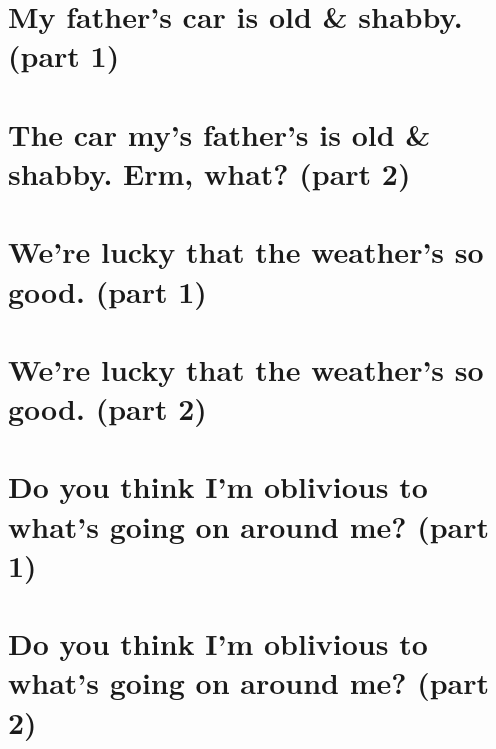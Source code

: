 \documentclass[oneside]{article}
\numberwithin{equation}{section}
\begin{document}
\section{My father's car is old \& shabby. (part 1)}

\section{The car my's father's is old \& shabby. Erm, what? (part 2)}

\section{We're lucky that the weather's so good. (part 1)}

\section{We're lucky that the weather's so good. (part 2)}

\section{Do you think I'm oblivious to what's going on around me? (part 1)}

\section{Do you think I'm oblivious to what's going on around me? (part 2)}


\printbibliography[heading=bibintoc]
\end{document}
